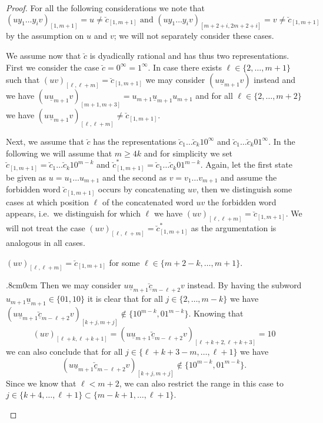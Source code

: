 \documentclass[11pt,reqno]{amsart}
\theoremstyle{plain}
\theoremstyle{definition}
\begin{document}
\begin{proof}
For all the following considerations we note that 
$$(uy_1\ldots y_iv)_{[1,m+1]}=u \neq  \breve{c}_{[1,m+1]}\text{ and }(uy_1\ldots y_iv)_{[m+2+i,2m+2+i]}=v\neq  \breve{c}_{[1,m+1]}$$ 
by the assumption on $u$ and $v$; we will not separately consider these cases. 
 

We assume now that $\breve{c}$ is dyadically rational and has thus two representations. First we consider the case 
$\breve{c}=0^{\infty}=1^{\infty}$. 
In case there exists $\ell\in \{2,\ldots, m+1\}$ such that 
$(uv)_{[\ell,\ell+m]}=\breve{c}_{[1,m+1]}$ we may consider 
$(u\underline{u}_{m+1}v)$ instead and we have 
$(u\underline{u}_{m+1}v)_{[m+1,m+3]}=u_{m+1}\underline{u}_{m+1}u_{m+1}$ and for all $\ell\in \{2,\ldots, m+2\}$ we have $(u\underline{u}_{m+1}v)_{[\ell,\ell+m]}\neq\breve{c}_{[1,m+1]}$.
 


Next, we assume that $\breve{c}$ has the representations 
$\breve{c}_1\ldots\breve{c}_k10^{\infty}$ and 
$\breve{c}_1\ldots\breve{c}_k01^{\infty}$.
In the following we will assume that $m\geqslant 4k$ and for simplicity we set 
$\breve{c}_{[1,m+1]}=\breve{c}_1\ldots\breve{c}_k10^{m-k}$
and $\breve{c}^\ast_{[1,m+1]}=\breve{c}_1\ldots\breve{c}_k01^{m-k}$.
Again, let the first state be given as $u=u_1\ldots u_{m+1}$ and the second as $v=v_1\ldots v_{m+1}$
and assume the forbidden word $\breve{c}_{[1,m+1]}$
occurs by concatenating $uv$, then we distinguish some cases at which position $\ell$ of the concatenated word $uv$ the forbidden word appears, i.e.\ we distinguish for which $\ell$ we have $(uv)_{[\ell,\ell+m]}=\breve{c}_{[1,m+1]}$.
We will not treat the case $(uv)_{[\ell,\ell+m]}=\breve{c}^\ast_{[1,m+1]}$ as the argumentation is analogous in all cases. 
 





$(uv)_{[\ell,\ell+m]}=\breve{c}_{[1,m+1]}$ for some $\ell\in \{m+2-k,\ldots,m+1\}$. 

\begin{adjustwidth}{.8cm}{0cm}
Then we may consider $u\underline{u}_{m+1}\breve{\underline{c}}_{m-\ell+2}v$ instead.
By having the subword $u_{m+1}\underline{u}_{m+1}\in \{01,10\}$ it is clear that for all $j\in \{2,\ldots, m-k\}$ we have 
$(u\underline{u}_{m+1}\breve{\underline{c}}_{m-\ell+2}v)_{[k+j,m+j]}\notin\{10^{m-k}, 01^{m-k}\}.$
Knowing that 
$$(uv)_{[\ell+k,\ell+k+1]}=(u\underline{u}_{m+1}\breve{\underline{c}}_{m-\ell+2}v)_{[\ell+k+2,\ell+k+3]}=10$$
 we can also conclude that for all $j\in \{\ell+k+3-m,\ldots,\ell+1\}$ we have 
$$(u\underline{u}_{m+1}\breve{\underline{c}}_{m-\ell+2}v)_{[k+j,m+j]}\notin\{10^{m-k}, 01^{m-k}\}.$$ 
Since we know that $\ell<m+2$, we can also restrict the range in this case to $j\in \{k+4,\ldots, \ell+1\}\subset\{m-k+1,\ldots, \ell+1\}$. 


\end{adjustwidth}
\end{proof}
\end{document}
